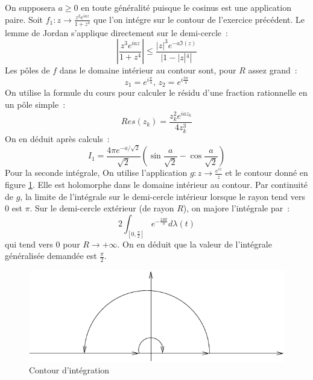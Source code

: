 \documentclass[a4paper, 12pt]{amsart}
\begin{document}
On supposera $a\geq0$ en toute généralité puisque le cosinus est une application
paire.
Soit $f_1 : z \to \frac{z^2 e^{iaz}}{1+z^4}$ que l'on intégre sur le contour
de l'exercice précédent.
Le lemme de Jordan s'applique directement sur le demi-cercle~:
\[
\left |
\frac{z^3 e^{iaz}}{1+z^4} 
\right | \leq \frac{|z|^3 e^{-a \Im(z)}}{|1-|z|^4|}
\]
Les pôles de $f$ dans le domaine intérieur au contour sont, pour $R$ assez
grand~:
\[
z_1 = e^{i\frac{\pi}{4}}, \, z_2 = e^{i\frac{3\pi}{4}}
\]
On utilise la formule du cours pour calculer le résidu d'une fraction
rationnelle en un pôle simple~: 
\[
Res(z_k) = \frac{z_k^2 e^{ia z_k}}{4 z_k^3}
\]
On en déduit après calculs~:
\[
I_1 = \frac{4 \pi e^{-a/\sqrt{2}}}{\sqrt{2}} \left (
\sin\frac{a}{\sqrt{2}} - \cos \frac{a}{\sqrt{2}} \right )
\]
Pour la seconde intégrale,
On utilise l'application $g : z \to \frac{e^{iz}}{z}$ et le contour donné en
figure \ref{fig:contour_sinc}. 
Elle est
holomorphe dans le domaine intérieur au contour. Par continuité
de $g$, la  limite de l'intégrale
sur le demi-cercle intérieur lorsque le rayon tend vers 0 est $\pi$. 
Sur le
demi-cercle extérieur (de rayon $R$), on majore l'intégrale par~:
\[
2 \int_{[0, \frac{\pi}{2}]} e^{- \frac{2 R t}{\pi}} d\lambda(t)
\]
qui tend vers 0 pour $R \to + \infty$. On en déduit que la valeur de
l'intégrale généralisée demandée est $\frac{\pi}{2}$.
\begin{figure}[ht]
\includegraphics[scale=1]{contour_sinc.pdf}
\caption{Contour d'intégration}\label{fig:contour_sinc}
\end{figure}
\end{document}
